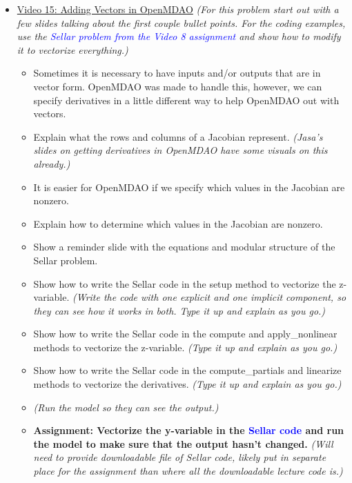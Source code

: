 \documentclass[12pt, letterpaper]{article}
\begin{document}
\begin{itemize}
	\item \underline{Video 15: Adding Vectors in OpenMDAO} \textit{(For this problem start out with a few slides talking about the first couple bullet points. For the coding examples, use the \textcolor{blue}{Sellar problem from the Video 8 assignment} and show how to modify it to vectorize everything.)}
		\begin{itemize}
			\item 	Sometimes it is necessary to have inputs and/or outputs that are in vector form. OpenMDAO was made to handle this, however, we can specify derivatives in a little different way to help OpenMDAO out with vectors.
			\item Explain what the rows and columns of a Jacobian represent. \textit{(Jasa's slides on getting derivatives in OpenMDAO have some visuals on this already.)}
			\item It is easier for OpenMDAO if we specify which values in the Jacobian are nonzero.
			\item Explain how to determine which values in the Jacobian are nonzero.
			\item Show a reminder slide with the equations and modular structure of the Sellar problem.
			\item Show how to write the Sellar code in the setup method to vectorize the z-variable. \textit{(Write the code with one explicit and one implicit component, so they can see how it works in both. Type it up and explain as you go.)}
			\item Show how to write the Sellar code in the compute and apply\_nonlinear methods to vectorize the z-variable.  \textit{(Type it up and explain as you go.)}
			\item Show how to write the Sellar code in the compute\_partials and linearize methods to vectorize the derivatives. \textit{(Type it up and explain as you go.)}
			\item \textit{(Run the model so they can see the output.)}
			\item \textbf{Assignment: Vectorize the y-variable in the \textcolor{blue}{Sellar code} and run the model to make sure that the output hasn’t changed.} \textit{(Will need to provide downloadable file of Sellar code, likely put in separate place for the assignment than where all the downloadable lecture code is.)}
		\end{itemize}
		

\end{itemize}
\end{document}
